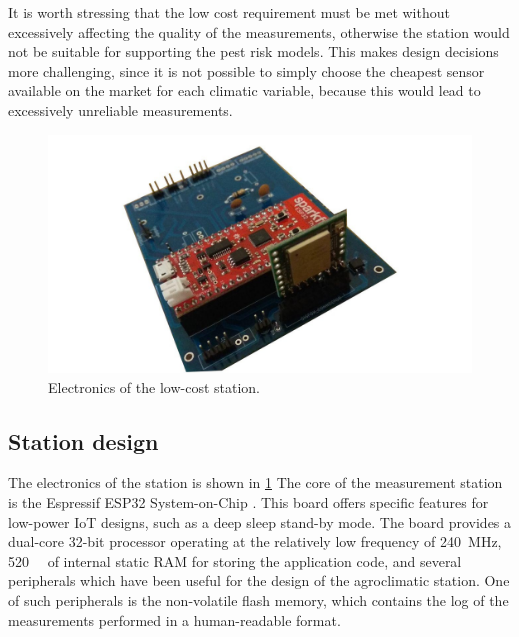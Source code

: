\documentclass[conference]{IEEEtran}
\begin{document}
It is worth stressing that the low cost requirement must be met without excessively affecting the quality of the measurements, otherwise the station would not be suitable for supporting the pest risk models. This makes design decisions more challenging, since it is not possible to simply choose the cheapest sensor available on the market for each climatic variable, because this would lead to excessively unreliable measurements.

\begin{figure}
    \centering
    \includegraphics[scale=.15]{lcn_board.jpg} %
    \caption{Electronics of the low-cost station.}
    \label{fig:station}
\end{figure}

\subsection{Station design}
The electronics of the station is shown in \cref{fig:station} The core of the measurement station is the Espressif ESP32 System-on-Chip \cite{espressif:sparkfun}. This board offers specific features for low-power IoT designs, such as a deep sleep stand-by mode. The board provides a dual-core 32-bit processor operating at the relatively low frequency of \SI{240}{\mega\hertz}, \SI{520}{\kilo\byte} of internal static RAM for storing the application code, and several peripherals which have been useful for the design of the agroclimatic station. One of such peripherals is the non-volatile flash memory, which contains the log of the measurements performed in a human-readable format. %

\end{document}
